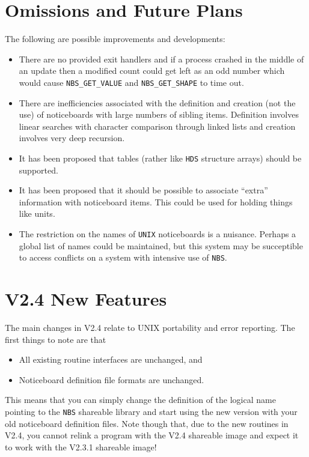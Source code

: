 \section {Omissions and Future Plans}

The following are possible improvements and developments:

\begin {itemize}
\item There are no provided exit handlers and if a process crashed in the
middle of an update then a modified count could get left as an odd number which
would cause {\tt NBS\_GET\_VALUE} and {\tt NBS\_GET\_SHAPE} to time out.
\item There are inefficiencies associated with the definition and creation
(not the use) of noticeboards with large numbers of sibling items. Definition
involves linear searches with character comparison through linked lists
and creation involves very deep recursion.
\item It has been proposed that tables (rather like {\tt HDS} structure arrays)
should be supported.
\item It has been proposed that it should be possible to associate ``extra''
information with noticeboard items. This could be used for holding things like
units.
\item The restriction on the names of {\tt UNIX} noticeboards is a
nuisance. Perhaps a global list of names could be maintained, but this
system may be succeptible to access conflicts on a system with intensive
use of {\tt NBS}.
\end {itemize}

\section {V2.4 New Features}
\label {V2.4 New Features}

The main changes in V2.4 relate to UNIX portability and error reporting.
The first things to note are that
\begin{itemize}
\item All existing routine interfaces are unchanged, and
\item Noticeboard definition file formats are unchanged.
\end{itemize}

This means that you can simply change the definition of the logical name
pointing to the {\tt NBS} shareable library and start using the new version
with your old noticeboard definition files. Note though that, due to the new
routines in V2.4, you cannot relink a program with the V2.4 shareable image
and expect it to work with the V2.3.1 shareable image!

